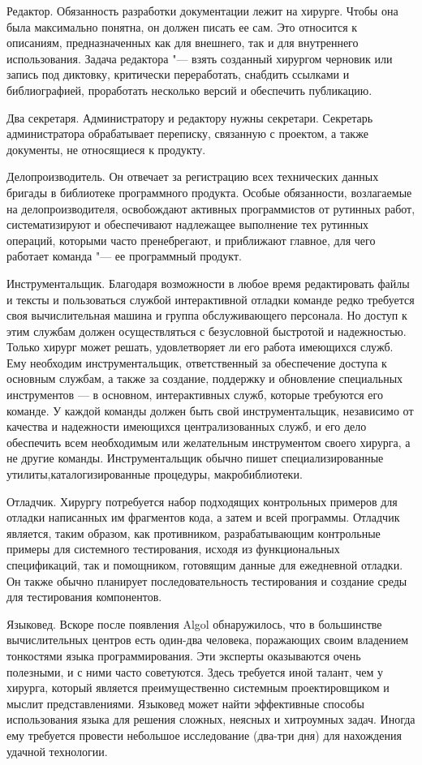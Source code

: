 \documentclass{../industrial-development}
\begin{document}
Редактор. Обязанность разработки документации лежит на хирурге. Чтобы она была максимально понятна, он должен писать ее сам. Это относится к описаниям, предназначенных как для внешнего, так и для внутреннего использования. Задача редактора "--- взять созданный хирургом черновик или запись под диктовку, критически переработать, снабдить ссылками и библиографией, проработать несколько версий и обеспечить публикацию.

Два секретаря. Администратору и редактору нужны секретари. Секретарь администратора обрабатывает переписку, связанную с проектом, а также документы, не относящиеся к продукту.

Делопроизводитель. Он отвечает за регистрацию всех технических данных бригады в библиотеке программного продукта. Особые обязанности, возлагаемые на делопроизводителя, освобождают активных программистов от рутинных работ, систематизируют и обеспечивают надлежащее выполнение тех рутинных операций, которыми часто пренебрегают, и приближают главное, для чего работает команда "--- ее программный продукт.

Инструментальщик. Благодаря возможности в любое время редактировать файлы и тексты и пользоваться службой интерактивной отладки команде редко требуется своя вычислительная машина и группа обслуживающего персонала. Но доступ к этим службам должен осуществляться с безусловной быстротой и надежностью. Только хирург может решать, удовлетворяет ли его работа имеющихся служб. Ему необходим инструментальщик, ответственный за обеспечение доступа к основным службам, а также за создание, поддержку и обновление специальных инструментов — в основном, интерактивных служб, которые требуются его команде. У каждой команды должен быть свой инструментальщик, независимо от качества и надежности имеющихся централизованных служб, и его дело обеспечить всем необходимым или желательным инструментом своего хирурга, а не другие команды. Инструментальщик обычно пишет специализированные утилиты,каталогизированные процедуры, макробиблиотеки.

Отладчик. Хирургу потребуется набор подходящих контрольных примеров для отладки написанных им фрагментов кода, а затем и всей программы. Отладчик является, таким образом, как противником, разрабатывающим контрольные примеры для системного тестирования, исходя из функциональных спецификаций, так и помощником, готовящим данные для ежедневной отладки. Он также обычно планирует последовательность тестирования и создание среды для тестирования компонентов.

Языковед. Вскоре после появления Algol обнаружилось, что в большинстве вычислительных центров есть один-два человека, поражающих своим владением тонкостями языка программирования. Эти эксперты оказываются очень полезными, и с ними часто советуются. Здесь требуется иной талант, чем у хирурга, который является преимущественно системным проектировщиком и мыслит представлениями. Языковед может найти эффективные способы использования языка для решения сложных, неясных и хитроумных задач. Иногда ему требуется провести небольшое исследование (два-три дня) для нахождения удачной технологии.
\end{document}
